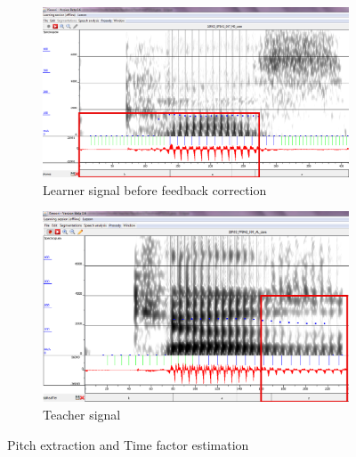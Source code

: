 \documentclass[11pt]{beamer}
\begin{document}
\begin{frame}

\begin{figure}
\begin{subfigure}{.5\textwidth}
  \centering
  \includegraphics[width=0.9\linewidth]{images/case_learner-pitchMarkers.PNG}
  \caption{Learner signal before feedback correction}
  \label{fig:sfig1}
\end{subfigure}%
\begin{subfigure}{.5\textwidth}
  \centering
  \includegraphics[width=0.9\linewidth]{images/teacher_case_Fricative.PNG}
  \caption{Teacher signal}
  \label{fig:sfig2}
\end{subfigure}
\caption{Pitch extraction and Time factor estimation}
\label{fig:fig}
\end{figure}
\end{frame}



\end{document}
